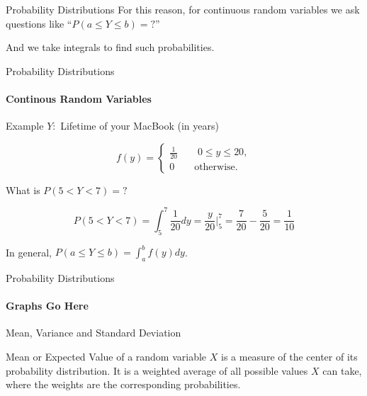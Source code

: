 \documentclass{beamer}\usepackage[]{graphicx}\usepackage[]{color}
\begin{document}
\begin{darkframes}
\begin{frame}[label=lists]{Probability Distributions}
      For this reason, for continuous random variables we ask questions like ``$P(a \leq Y \leq b)=?$'' \newline
      
      And we take integrals to find such probabilities.
			
	\end{frame}


	\begin{frame}[label=lists]{Probability Distributions}
		\framesubtitle{Continous Random Variables} 

		\begin{exampleblock}{Example}
		$Y:$ Lifetime of your MacBook (in years) \newline
		
		$$ f(y) = 
			\begin{cases}
				\frac{1}{20} \qquad 0 \leq y \leq 20, \\
				0 \qquad   \text{otherwise.}
			\end{cases}
		$$
		
		What is $P(5<Y<7)=?$ 
		
		$$
			P(5<Y<7) = \int_5^7 \frac{1}{20} dy = \frac{y}{20} |_5^7 = \frac{7}{20} - \frac{5}{20} =  \frac{1}{10}
		$$
		
		
		\end{exampleblock}
		
		In general, \alert{$P(a \leq Y \leq b) = \int_a^b f(y)dy$}.
				
	\end{frame}




	\begin{frame}[label=lists]{Probability Distributions}
		\framesubtitle{Graphs Go Here} 


				
	\end{frame}
	
	
	
	\begin{frame}[label=lists]{Mean, Variance and Standard Deviation}
		
		\begin{definition}
			\alert{Mean} or \alert{Expected Value} of a random variable $X$ is a measure of the center of its probability distribution. It is a weighted average of all possible values $X$ can take, where the weights are the corresponding probabilities. 
		\end{definition}
		

\end{frame}
\end{darkframes}
\end{document}
